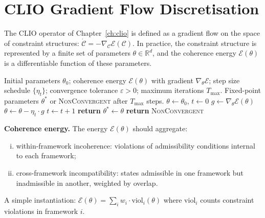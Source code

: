 \documentclass[11pt,openany]{book}
\begin{document}
\section{CLIO Gradient Flow Discretisation}
\label{sec:clio-impl}

The CLIO operator of Chapter~\ref{ch:clio} is defined as a
gradient flow on the space of constraint structures:
$\dot{\mathcal{C}} = -\nabla_{\mathcal{C}}
\mathcal{E}(\mathcal{C})$.  In practice, the constraint
structure is represented by a finite set of parameters
$\theta \in \mathbb{R}^d$, and the coherence energy
$\mathcal{E}(\theta)$ is a differentiable function of these
parameters.

\begin{algorithm}
\caption{CLIO Gradient Descent}
\label{alg:clio}
\begin{algorithmic}
\Require Initial parameters $\theta_0$; coherence energy
  $\mathcal{E}(\theta)$ with gradient $\nabla_\theta
  \mathcal{E}$; step size schedule $\{\eta_t\}$;
  convergence tolerance $\varepsilon > 0$;
  maximum iterations $T_{\max}$.
\Ensure Fixed-point parameters $\theta^*$ or
  \textsc{NonConvergent} after $T_{\max}$ steps.
\State $\theta \gets \theta_0$, $t \gets 0$
\Repeat
  \State $g \gets \nabla_\theta \mathcal{E}(\theta)$
  \State $\theta \gets \theta - \eta_t \cdot g$
  \State $t \gets t + 1$
  \State \textbf{return} $\theta^* \gets \theta$
\Else
  \State \textbf{return} \textsc{NonConvergent}
\EndIf
\end{algorithmic}
\end{algorithm}

\textbf{Coherence energy.} The energy $\mathcal{E}(\theta)$
should aggregate:
\begin{enumerate}[(i)]
  \item within-framework incoherence: violations of
    admissibility conditions internal to each framework;
  \item cross-framework incompatibility: states admissible
    in one framework but inadmissible in another, weighted
    by overlap.
\end{enumerate}
A simple instantiation: $\mathcal{E}(\theta) =
\sum_i w_i \cdot \mathrm{viol}_i(\theta)$ where
$\mathrm{viol}_i$ counts constraint violations in framework
$i$.
\end{document}
